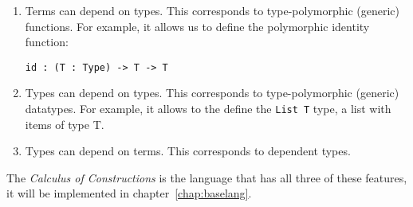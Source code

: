 \begin{enumerate}
	\item Terms can depend on types. This corresponds to type-polymorphic (generic) functions. For example, it allows us to define the polymorphic identity function:
	\begin{lstlisting}
id : (T : Type) -> T -> T
	\end{lstlisting}
	\item Types can depend on types. This corresponds to type-polymorphic (generic) datatypes. For example, it allows to the define the \verb|List T| type, a list with items of type T.
	
	\item Types can depend on terms. This corresponds to dependent types.
\end{enumerate}

The \textit{Calculus of Constructions} is the language that has all three of these features, it will be implemented in chapter~\ref{chap:baselang}.
